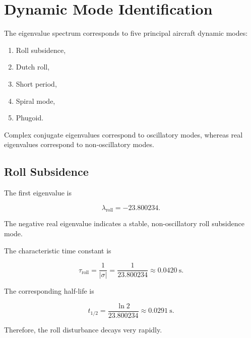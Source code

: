 \documentclass[11pt,a4paper]{article}
\begin{document}
\section{Dynamic Mode Identification}

The eigenvalue spectrum corresponds to five principal aircraft dynamic
modes:

\begin{enumerate}
    \item Roll subsidence,
    \item Dutch roll,
    \item Short period,
    \item Spiral mode,
    \item Phugoid.
\end{enumerate}

Complex conjugate eigenvalues correspond to oscillatory modes, whereas
real eigenvalues correspond to non-oscillatory modes.

\subsection{Roll Subsidence}

The first eigenvalue is

\begin{equation}
\lambda_{\mathrm{roll}}
=
-23.800234.
\end{equation}

The negative real eigenvalue indicates a stable, non-oscillatory roll
subsidence mode.

The characteristic time constant is

\begin{equation}
\tau_{\mathrm{roll}}
=
\frac{1}{|\sigma|}
=
\frac{1}{23.800234}
\approx0.0420~\mathrm{s}.
\end{equation}

The corresponding half-life is

\begin{equation}
t_{1/2}
=
\frac{\ln2}{23.800234}
\approx0.0291~\mathrm{s}.
\end{equation}

Therefore, the roll disturbance decays very rapidly.

\end{document}
